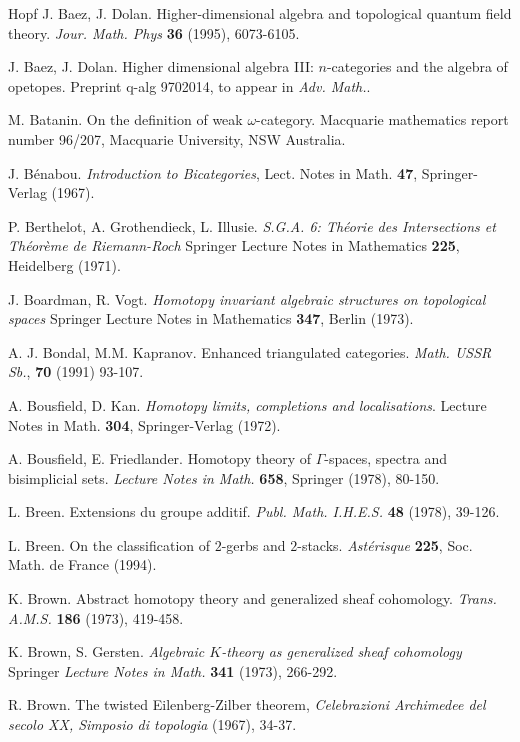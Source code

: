 \begin{thebibliography}{Hopf}
J. Baez, J. Dolan. Higher-dimensional algebra and
topological quantum field theory. {\em  Jour. Math. Phys} {\bf  36} (1995),
6073-6105.

J. Baez, J. Dolan. Higher dimensional algebra III: $n$-categories and the
algebra of opetopes.
Preprint
q-alg 9702014, to appear in {\em Adv. Math.}.

M. Batanin. On the definition of weak $\omega$-category. Macquarie mathematics
report number 96/207, Macquarie University, NSW Australia.

J. B\'enabou. {\em Introduction to Bicategories}, Lect. Notes in Math. {\bf
47}, Springer-Verlag (1967).

P. Berthelot, A. Grothendieck, L. Illusie. {\em S.G.A. 6:
Th\'eorie des Intersections et Th\'eor\`eme de Riemann-Roch} Springer Lecture
Notes in Mathematics {\bf 225}, Heidelberg (1971).

J. Boardman, R. Vogt. {\em Homotopy invariant algebraic structures
on topological spaces} Springer Lecture Notes in Mathematics {\bf 347}, Berlin
(1973).

A. J. Bondal, M.M. Kapranov. Enhanced triangulated categories.
{\em Math. USSR Sb.},
{\bf 70} (1991) 93-107.

A. Bousfield, D. Kan. {\em Homotopy limits, completions and localisations}.
Lecture Notes in Math. {\bf 304}, Springer-Verlag (1972).

A. Bousfield, E. Friedlander. Homotopy theory of $\Gamma$-spaces, spectra and
bisimplicial sets. {\em Lecture Notes in Math.} {\bf 658}, Springer (1978),
80-150.

L. Breen. Extensions du groupe additif. {\em Publ. Math. I.H.E.S.} {\bf 48}
(1978), 39-126.

L. Breen. On the classification of $2$-gerbs and $2$-stacks. {\em Ast\'erisque}
{\bf 225}, Soc. Math. de France (1994).

K. Brown. Abstract homotopy theory and generalized sheaf cohomology. {\em
Trans. A.M.S.} {\bf 186} (1973), 419-458.

K. Brown, S. Gersten. {\em Algebraic $K$-theory as generalized sheaf cohomology}
Springer {\em Lecture Notes in Math.} {\bf 341} (1973), 266-292.

R. Brown. The twisted Eilenberg-Zilber theorem, {\em Celebrazioni Archimedee del
secolo XX, Simposio di topologia} (1967), 34-37.


\end{thebibliography}
